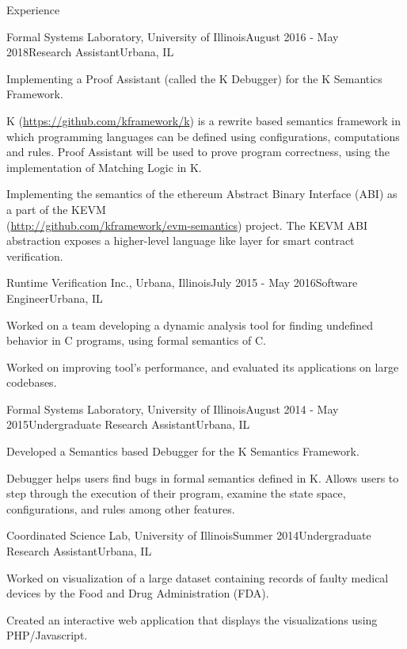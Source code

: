 \documentclass{resume} %
\begin{document}
\begin{rSection}{Experience}
\begin{rSubsection}{Formal Systems Laboratory, University of Illinois}{August 2016 - May 2018}{Research Assistant}{Urbana, IL}
\item Implementing a Proof Assistant (called the K Debugger) for the K Semantics Framework.
\item K (\url{https://github.com/kframework/k}) is a rewrite based semantics framework in which programming
languages can be defined using configurations, computations and rules. Proof Assistant will be used to prove program correctness, using the implementation of Matching Logic in K.
\item Implementing the semantics of the ethereum Abstract Binary Interface (ABI) as a part of the KEVM \\
  (\url{http://github.com/kframework/evm-semantics}) project. The KEVM ABI abstraction
  exposes a higher-level language like layer for smart contract verification.
\end{rSubsection}

\begin{rSubsection}{Runtime Verification Inc., Urbana, Illinois}{July 2015 - May 2016}{Software Engineer}{Urbana, IL}
\item Worked on a team developing a dynamic analysis tool for finding undefined behavior in C programs, using formal semantics of C.
\item Worked on improving tool's performance, and evaluated its applications on large codebases.
\end{rSubsection}

\begin{rSubsection}{Formal Systems Laboratory, University of Illinois}{August
  2014 - May 2015}{Undergraduate Research Assistant}{Urbana, IL}
\item Developed a Semantics based Debugger for the K Semantics Framework.
\item Debugger helps users find bugs in formal semantics defined in K. Allows users to step
through the execution of their program, examine the state space, configurations, and rules
among other features.
\end{rSubsection}

\begin{rSubsection}{Coordinated Science Lab, University of Illinois}{Summer
  2014}{Undergraduate Research Assistant}{Urbana, IL}
\item Worked on visualization of a large dataset containing records of faulty medical devices by the Food and Drug Administration (FDA).
\item Created an interactive web application that displays the visualizations using PHP/Javascript.
\end{rSubsection}

\end{rSection}
\end{document}
